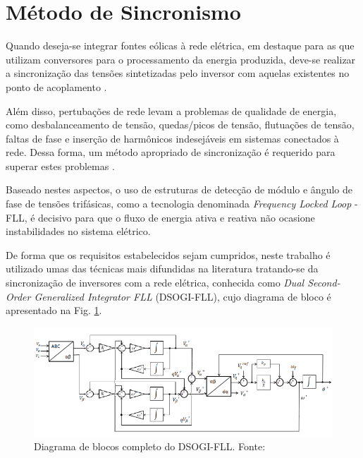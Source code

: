 \section{Método de Sincronismo}

Quando deseja-se integrar fontes eólicas à rede elétrica, em destaque para as que utilizam conversores para o processamento da energia produzida, deve-se realizar a sincronização das tensões sintetizadas pelo inversor com aquelas existentes no ponto de acoplamento \cite{TeseProfAlex}. 

Além disso, pertubações de rede levam a problemas de qualidade de energia, como desbalanceamento de tensão, quedas/picos de tensão, flutuações de tensão, faltas de fase e inserção de harmônicos indesejáveis em sistemas conectados à rede. Dessa forma, um método apropriado de sincronização é requerido para superar estes problemas \cite{Meral2018}. 

Baseado nestes aspectos, o uso de estruturas de detecção de módulo e ângulo de fase de tensões trifásicas, como a tecnologia denominada \textit{Frequency Locked Loop} - FLL, é decisivo para que o fluxo de energia ativa e reativa não ocasione instabilidades no sistema elétrico.

De forma que os requisitos estabelecidos sejam cumpridos, neste trabalho é utilizado umas das técnicas mais difundidas na literatura tratando-se da sincronização de inversores com a rede elétrica, conhecida como \textit{Dual Second-Order Generalized Integrator FLL} (DSOGI-FLL), cujo diagrama de bloco é apresentado na Fig. \ref{fig:DSOGI_FLL}.  

\begin{figure}[!hbt]
	\begin{center}
		\includegraphics[width=\columnwidth]{figuras/DSOGI_PLL.PNG}
		\caption{Diagrama de blocos completo do DSOGI-FLL. Fonte: \cite{DissertacaoJoao}}
		\label{fig:DSOGI_FLL}
	\end{center}
\end{figure}

